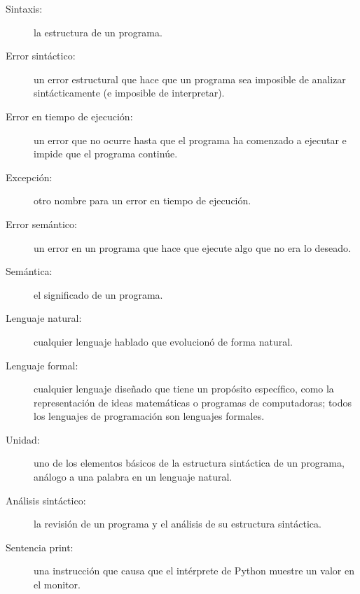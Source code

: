 \begin{description}
\item[Sintaxis:]  la estructura de un programa.

\item[Error sintáctico:]  un error estructural que hace que un
programa sea imposible de analizar sintácticamente (e imposible de
interpretar).

\item[Error en tiempo de ejecución:]  un error que no ocurre hasta
que el programa ha comenzado a ejecutar e impide que el programa
continúe.

\item[Excepción:]  otro nombre para un error en tiempo de ejecución.

\item[Error semántico:]   un error en un programa que hace que ejecute
algo que no era lo deseado.

\item[Semántica:]  el significado de un programa.

\item[Lenguaje natural:]  cualquier lenguaje hablado que evolucionó
de forma natural.

\item[Lenguaje formal:]  cualquier lenguaje diseñado que tiene un
propósito específico, como la representación de ideas matemáticas
o programas de computadoras; todos los lenguajes de programación
son lenguajes formales.

\item[Unidad:]  uno de los elementos básicos de la estructura
sintáctica de un programa, análogo a una palabra en un lenguaje
natural.

\item[Análisis sintáctico:]  la revisión de un programa y el
análisis de su estructura sintáctica.

\item[Sentencia print:]  una instrucción que causa que el
intérprete de Python muestre un valor en el monitor.



\end{description}


